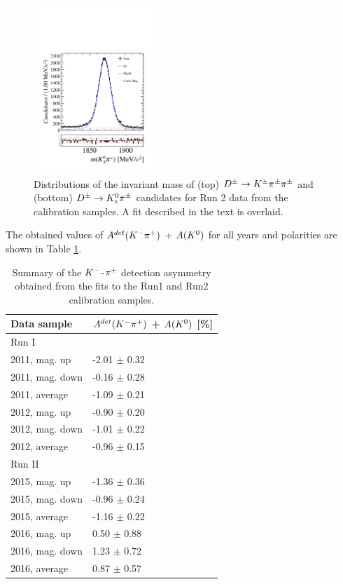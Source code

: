 \begin{figure}[h]
\includegraphics[height=!,width=0.4\textwidth]{figs/KpiAsym/fit_positive_kspi_15up.pdf}
\caption{Distributions of the invariant mass of (top) ${{D}^\pm}\rightarrow{\ensuremath{{K}^\pm}}{\ensuremath{{\pi}^\pm}}{\ensuremath{{\pi}^\pm}}$ and (bottom) ${{D}^\pm}\rightarrow{\ensuremath{{K}^0_{\mathrm{ \scriptscriptstyle S}}}}{\ensuremath{{\pi}^\pm}}$ candidates for Run 2 data from the calibration samples. A fit described in the text is overlaid.}
\label{fig:KpiAsymFitsRun2}
\end{figure}


The obtained values of $A^{det}({{K}^-}{{\pi}^+})$ + $A({{K}^0})$ for all years and polarities are shown in Table \ref{table:KpiDetectionAsym}.

\begin{table}[h]
\centering
 \begin{tabular}{l | l}
Data sample & $A^{det}({{K}^-}{{\pi}^+})$ + $A({{K}^0})$ [\%] \\
\hline\hline
Run I & \\
\hline
2011, mag. up & -2.01 $\pm$ 0.32\\
2011, mag. down &  -0.16 $\pm$  0.28\\
2011, average & -1.09 $\pm$ 0.21\\
\hline
2012, mag. up &  -0.90 $\pm$ 0.20\\
2012, mag. down & -1.01 $\pm$ 0.22 \\
2012, average & -0.96 $\pm$ 0.15\\
\hline\hline
Run II &  \\
\hline
2015, mag. up & -1.36 $\pm$ 0.36 \\
2015, mag. down & -0.96 $\pm$ 0.24 \\
2015, average & -1.16 $\pm$ 0.22\\
\hline
2016, mag. up &  0.50 $\pm$ 0.88\\
2016, mag. down & 1.23 $\pm$ 0.72 \\
2016, average & 0.87 $\pm$ 0.57\\
\hline
\end{tabular}
\caption{Summary of the ${{K}^-}$-${{\pi}^+}$ detection asymmetry obtained from the fits to the Run1 and Run2 calibration samples.}
\label{table:KpiDetectionAsym}
\end{table}
